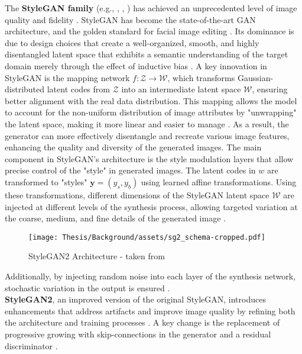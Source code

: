 The \textbf{StyleGAN family} (e.g., \cite{stylegan1}, \cite{stylegan2}, \cite{stylegan2ada}) has achieved an unprecedented level of image quality and fidelity \citep[p.1]{tov2021designing}. StyleGAN has become the state-of-the-art GAN architecture, and the golden standard for facial image editing \cite[p.1]{bermano2022state}. Its dominance is due to design choices that create a well-organized, smooth, and highly disentangled latent space that exhibits a semantic understanding of the target domain merely through the effect of inductive bias \citep[p.6]{bermano2022state}. A key innovation in StyleGAN is the mapping network $f: \mathcal{Z} \rightarrow \mathcal{W}$, which transforms Gaussian-distributed latent codes from $\mathcal{Z}$ into an intermediate latent space $\mathcal{W}$, ensuring better alignment with the real data distribution. This mapping allows the model to account for the non-uniform distribution of image attributes by "unwrapping" the latent space, making it more linear and easier to manage \citep[p.6]{stylegan1}. As a result, the generator can more effectively disentangle and recreate various image features, enhancing the quality and diversity of the generated images. The main component in StyleGAN's architecture is the style modulation layers that allow precise control of the "style" in generated images. The latent codes in $w$ are transformed to "styles" $\bm{y} = (y_s, y_b)$ using learned affine transformations. Using these transformations, different dimensions of the StyleGAN latent space $\mathcal{W}$ are injected at different levels of the synthesis process, allowing targeted variation at the coarse, medium, and fine details of the generated image \citep[p.4]{stylegan1}. 
\begin{wrapfigure}{r}{7cm}
    \texttt{[image: Thesis/Background/assets/sg2\_schema-cropped.pdf]}
    \caption[StyleGAN2 Architecture]{StyleGAN2 Architecture - taken from \cite{hermosilla2021thermal}}
    \label{fig:stylegan2_schema}
\end{wrapfigure} 
Additionally, by injecting random noise into each layer of the synthesis network, stochastic variation in the output is ensured \citep[p.1]{stylegan2}. \\
\textbf{StyleGAN2}, an improved version of the original StyleGAN, introduces enhancements that address artifacts and improve image quality by refining both the architecture and training processes \citep[p.2]{stylegan2}. 
A key change is the replacement of progressive growing with skip-connections in the generator and a residual discriminator \citep[p.6]{stylegan2}. 
